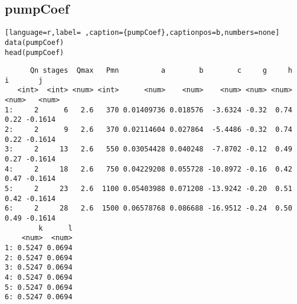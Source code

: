 \subsection{pumpCoef}
\label{sec:orgac6578d}
\label{subsec:pumpcoef}
\begin{lstlisting}[language=r,label= ,caption={pumpCoef},captionpos=b,numbers=none]
data(pumpCoef)
head(pumpCoef)
\end{lstlisting}

\begin{verbatim}
      Qn stages  Qmax   Pmn          a        b        c     g     h     i       j
   <int>  <int> <num> <int>      <num>    <num>    <num> <num> <num> <num>   <num>
1:     2      6   2.6   370 0.01409736 0.018576  -3.6324 -0.32  0.74  0.22 -0.1614
2:     2      9   2.6   370 0.02114604 0.027864  -5.4486 -0.32  0.74  0.22 -0.1614
3:     2     13   2.6   550 0.03054428 0.040248  -7.8702 -0.12  0.49  0.27 -0.1614
4:     2     18   2.6   750 0.04229208 0.055728 -10.8972 -0.16  0.42  0.47 -0.1614
5:     2     23   2.6  1100 0.05403988 0.071208 -13.9242 -0.20  0.51  0.42 -0.1614
6:     2     28   2.6  1500 0.06578768 0.086688 -16.9512 -0.24  0.50  0.49 -0.1614
        k      l
    <num>  <num>
1: 0.5247 0.0694
2: 0.5247 0.0694
3: 0.5247 0.0694
4: 0.5247 0.0694
5: 0.5247 0.0694
6: 0.5247 0.0694
\end{verbatim}
